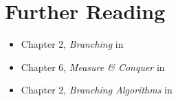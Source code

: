 \section{Further Reading}

\begin{frame}

 \begin{itemize}
   \item Chapter 2, \emph{Branching} in \cite{FominK10}
   \item Chapter 6, \emph{Measure \& Conquer} in \cite{FominK10}
   \item Chapter 2, \emph{Branching Algorithms} in \cite{Gaspers10}
 \end{itemize}

\end{frame}


\begin{frame}[t, allowframebreaks]
	\printbibliography
\end{frame}


